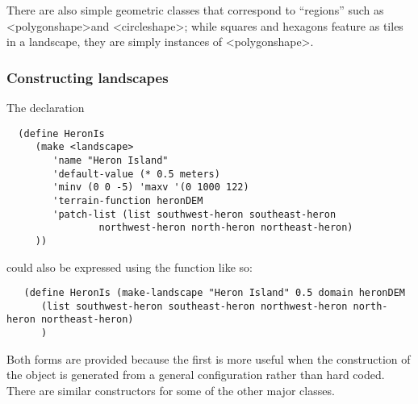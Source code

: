 \documentclass[a4]{article}
\newcommand{\rclass}[1]{\textsf{<#1>}}
\newcommand{\Function}[1]{\textbf{\slfamily{#1}}}
\newcommand{\polygonshape}[0]{\rclass{polygonshape}}
\newcommand{\circleshape}[0]{\rclass{circleshape}}
\begin{document}
There are also simple geometric classes that correspond to ``regions''
such as \polygonshape and \circleshape; while squares and hexagons
feature as tiles in a landscape, they are simply instances of
\polygonshape.

\subsubsection{Constructing landscapes}

The declaration
\begin{verbatim}
  (define HeronIs 
     (make <landscape>
        'name "Heron Island" 
        'default-value (* 0.5 meters)
        'minv (0 0 -5) 'maxv '(0 1000 122)
        'terrain-function heronDEM
        'patch-list (list southwest-heron southeast-heron
                northwest-heron north-heron northeast-heron)
     ))
\end{verbatim}
could also be expressed using the function \Function{make-landscape}
like so:
\begin{verbatim}
   (define HeronIs (make-landscape "Heron Island" 0.5 domain heronDEM 
      (list southwest-heron southeast-heron northwest-heron north-heron northeast-heron)
      )
\end{verbatim}

Both forms are provided because the first is more useful when the
construction of the object is generated from a general configuration
rather than hard coded.  There are similar constructors
for some of the other major classes.
\end{document}
